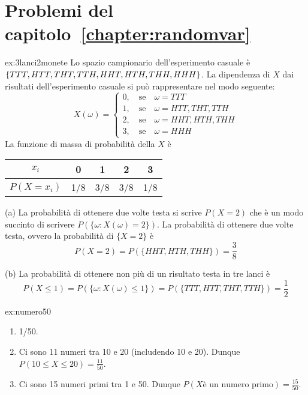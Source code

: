 \section*{Problemi del capitolo~\ref{chapter:randomvar}}

\begin{sol}{ex:3lanci2monete}
Lo spazio campionario dell'esperimento casuale è $\{TTT, HTT, THT, TTH, HHT, HTH,\\ THH, HHH \}$. 
La dipendenza di $X$ dai risultati dell'esperimento casuale si può rappresentare nel modo seguente:
$$
X(\omega) =
\begin{cases}
  0, \quad \text{se}\quad \omega = TTT\\
  1, \quad \text{se}\quad \omega = HTT, THT, TTH\\
  2, \quad \text{se}\quad \omega = HHT, HTH, THH\\
  3, \quad \text{se}\quad \omega = HHH
  \end{cases}
$$ 
La funzione di massa di probabilità della $X$ è
\begin{center}
\begin{tabular}{ ccccc }
\hline
  $x_i$      & 0   & 1   & 2   & 3 \\\hline
  $P(X=x_i)$ & 1/8 & 3/8 & 3/8 & 1/8\\\hline
\end{tabular}
\end{center}

(a) La probabilità di ottenere due volte testa si scrive $P(X=2)$ che è un modo succinto di scrivere $P(\{\omega: X(\omega) = 2\})$.  
La probabilità di ottenere due volte testa, ovvero la probabilità di $\{ X = 2 \}$ è  $$ P(X=2) = P(\{ HHT, HTH, THH\}) = \frac{3}{8}$$

(b) La probabilità di ottenere non più di un risultato testa in tre lanci è
$$
P(X \le 1) = P(\{ \omega: X(\omega) \le 1 \}) = P(\{TTT, HTT, THT, TTH \}) = \frac{1}{2}
$$
\end{sol}


\begin{sol}{ex:numero50}
\begin{enumerate}
\item 1/50.
\item Ci sono 11 numeri tra 10 e 20 (includendo 10 e 20). Dunque 
$
P(10 \le X \le 20 ) = \frac{11}{50}
$.
\item Ci sono 15 numeri primi tra 1 e 50.  Dunque 
$
P(X \text{è un numero primo}) = \frac{15}{50}
$.
\end{enumerate}
\end{sol}

